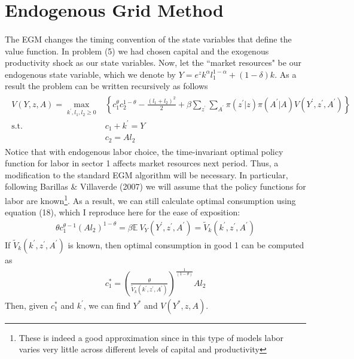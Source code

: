 \documentclass[11pt,a4paper]{article}
\begin{document}
\section{Endogenous Grid Method}
\paragraph{} The EGM changes the timing convention of the state variables that define the value function. In problem (5) we had chosen capital and the exogenous productivity shock as our state variables. Now, let the ``market resources" be our endogenous state variable, which we denote by $Y= e^z k^{\alpha} l_1^{1-\alpha} + (1-\delta)k$. As a result the problem can be written recursively as follows
\begin{align}
\begin{split}
V(Y,z,A)=\max _{k^{\prime}, l_1, l_2 \geq 0}&\left\{c_{1}^{\theta} c_{2}^{1-\theta}-\frac{(l_{1}+l_{2})^{2}}{2}+\beta\sum_{z^{\prime}} \sum_{A^{\prime}}\pi\left(z^{\prime}| z\right) \pi\left(A^{\prime} | A\right) V\left( Y^{\prime},z^{\prime},A^{\prime}\right)\right\} \\
\text{s.t.} \quad & c_{1} + k^{\prime} = Y  \\
 & c_{2} = A l_{2}
\end{split}
\end{align}
Notice that with endogenous labor choice, the time-invariant optimal policy function for labor in sector 1 affects market resources next period. Thus, a modification to the standard EGM algorithm will be necessary. In particular, following Barillas \& Villaverde (2007) we will assume that the policy functions for labor are known\footnote{ These is indeed a good approximation since in this type of models labor varies very little across different levels of capital and productivity}.  As a result, we can still calculate optimal consumption using equation (18), which I reproduce here for the ease of exposition:
\begin{align*}
\theta c_1^{\theta - 1} \left( A l_2\right)^{1-\theta} = \beta \mathbb{E} \: V_Y\left( Y^{\prime},z^{\prime},A^{\prime}\right) = \tilde{V}_k\left( k^{\prime}, z^{\prime},A^{\prime}\right)
\end{align*}
If $\tilde{V}_k\left( k^{\prime}, z^{\prime},A^{\prime}\right)$ is known, then optimal consumption in good 1 can be computed as
\begin{align}
c_1^* = \left(\frac{\theta}{\tilde{V}_k\left( k^{\prime}, z^{\prime},A^{\prime}\right)}\right)^{\frac{1}{(1-\theta)}}  A l_2
\end{align}
Then, given $c_1^*$ and $k^{\prime}$, we can find $Y^*$ and $V(Y^*, z, A)$.
\end{document}
